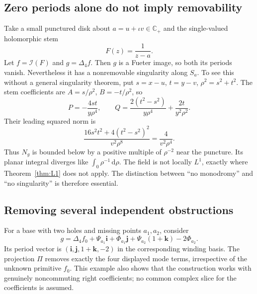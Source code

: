 \documentclass[11pt,a4paper]{article}
\numberwithin{equation}{section}
\theoremstyle{definition}
\theoremstyle{remark}
\newcommand{\C}{\mathbb C}
\newcommand{\lap}{\Delta_4}
\newcommand{\lift}{\mathcal I}
\newcommand{\dd}{\,\mathrm d}
\newcommand{\ii}{\mathbf i}
\newcommand{\jj}{\mathbf j}
\newcommand{\kk}{\mathbf k}
\begin{document}
\subsection{Zero periods alone do not imply removability}
Take a small punctured disk about $a=u+\iota v\in\C_+$ and the
single-valued holomorphic stem
\[
 F(z)=\frac1{z-a}.
\]
Let $f=\lift(F)$ and $g=\lap f$. Then $g$ is a Fueter image, so
both its periods vanish. Nevertheless it has a nonremovable singularity
along $S_a$. To see this without a general singularity theorem, put
$s=x-u$, $t=y-v$, $\rho^2=s^2+t^2$. The stem coefficients are
$A=s/\rho^2$, $B=-t/\rho^2$, so
\[
 P=-\frac{4st}{y\rho^4},\qquad
 Q=\frac{2(t^2-s^2)}{y\rho^4}+\frac{2t}{y^2\rho^2}.
\]
Their leading squared norm is
\[
 \frac{16s^2t^2+4(t^2-s^2)^2}{v^2\rho^8}
       =\frac4{v^2\rho^4}.
\]
Thus $N_g$ is bounded below by a positive multiple of $\rho^{-2}$
near the puncture. Its planar integral diverges like
$\int_0 \rho^{-1}\dd\rho$. The field is not locally $L^1$, exactly
where Theorem~\ref{thm:L1} does not apply. The distinction between
``no monodromy'' and ``no singularity'' is therefore essential.

\subsection{Removing several independent obstructions}
For a base with two holes and missing points $a_1,a_2$, consider
\[
 g=\lap f_0+\Psi_{a_1}\ii+\Phi_{a_1}\jj
              +\Psi_{a_2}(1+\kk)-2\Phi_{a_2}.
\]
Its period vector is $(\ii,\jj,1+\kk,-2)$ in the corresponding winding
basis. The projection $\Pi$ removes exactly the four displayed mode
terms, irrespective of the unknown primitive $f_0$. This example also
shows that the construction works with genuinely noncommuting right
coefficients; no common complex slice for the coefficients is assumed.
\end{document}
